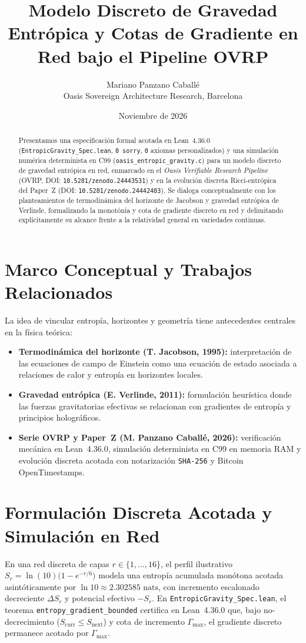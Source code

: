 \documentclass[11pt,a4paper]{article}
\title{Modelo Discreto de Gravedad Entr\'opica y Cotas de Gradiente en Red bajo el Pipeline OVRP}
\author{Mariano Panzano Caball\'e \\ \small Oasis Sovereign Architecture Research, Barcelona}
\date{Noviembre de 2026}
\begin{document}
\maketitle

\begin{abstract}
Presentamos una especificaci\'on formal acotada en Lean~4.36.0 (\texttt{EntropicGravity\_Spec.lean}, \texttt{0 sorry}, \texttt{0} axiomas personalizados) y una simulaci\'on num\'erica determinista en C99 (\texttt{oasis\_entropic\_gravity.c}) para un modelo discreto de gravedad entr\'opica en red, enmarcado en el \emph{Oasis Verifiable Research Pipeline} (OVRP, DOI: \texttt{10.5281/zenodo.24443531}) y en la evoluci\'on discreta Ricci-entr\'opica del Paper~Z (DOI: \texttt{10.5281/zenodo.24442403}). Se dialoga conceptualmente con los planteamientos de termodin\'amica del horizonte de Jacobson y gravedad entr\'opica de Verlinde, formalizando la monot\'onia y cota de gradiente discreto en red y delimitando expl\'icitamente su alcance frente a la relatividad general en variedades continuas.
\end{abstract}

\section{Marco Conceptual y Trabajos Relacionados}
La idea de vincular entrop\'ia, horizontes y geometr\'ia tiene antecedentes centrales en la f\'isica te\'orica:
\begin{itemize}
    \item \textbf{Termodin\'amica del horizonte (T. Jacobson, 1995):} interpretaci\'on de las ecuaciones de campo de Einstein como una ecuaci\'on de estado asociada a relaciones de calor y entrop\'ia en horizontes locales.
    \item \textbf{Gravedad entr\'opica (E. Verlinde, 2011):} formulaci\'on heur\'istica donde las fuerzas gravitatorias efectivas se relacionan con gradientes de entrop\'ia y principios hologr\'aficos.
    \item \textbf{Serie OVRP y Paper~Z (M. Panzano Caball\'e, 2026):} verificaci\'on mec\'anica en Lean~4.36.0, simulaci\'on determinista en C99 en memoria RAM y evoluci\'on discreta acotada con notarizaci\'on \texttt{SHA-256} y Bitcoin OpenTimestamps.
\end{itemize}

\section{Formulación Discreta Acotada y Simulación en Red}
En una red discreta de capas $r \in \{1,\dots,16\}$, el perfil ilustrativo $S_r = \ln(10)\bigl(1 - e^{-r/6}\bigr)$ modela una entrop\'ia acumulada mon\'otona acotada asint\'oticamente por $\ln 10 \approx 2.302585\text{ nats}$, con incremento escalonado decreciente $\Delta S_r$ y potencial efectivo $-S_r$. En \texttt{EntropicGravity\_Spec.lean}, el teorema \texttt{entropy\_gradient\_bounded} certifica en Lean~4.36.0 que, bajo no-decrecimiento ($S_{\mathrm{curr}} \le S_{\mathrm{next}}$) y cota de incremento $\Gamma_{\max}$, el gradiente discreto permanece acotado por $\Gamma_{\max}$.
\end{document}
